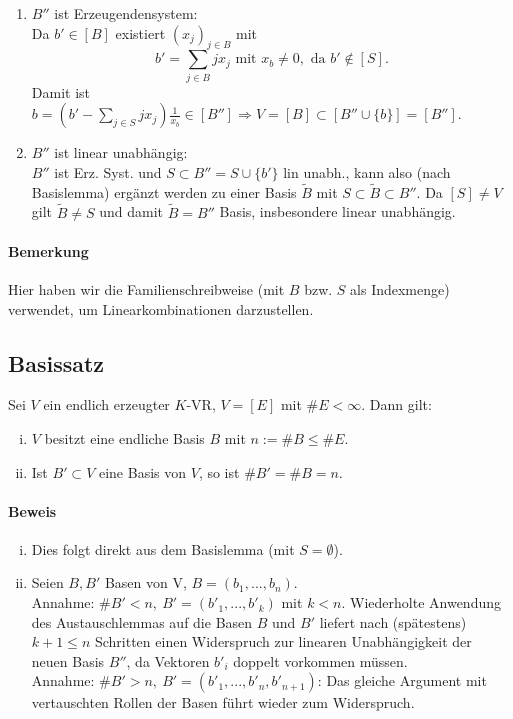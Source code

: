     \begin{enumerate}
	    \item $B''$ ist Erzeugendensystem:\\
	    Da $b'\in [B]$ existiert $(x_j)_{j\in B}$ mit
		    \[b' = \sum_{j\in B} jx_j \text{ mit } x_b \neq 0, \text{ da } b' \notin [S].\]
	    Damit ist $b=(b'-\sum_{j\in S} jx_j)\frac{1}{x_b} \in [B''] \Rightarrow V = [B] \subset [B'' \cup \{b\}] =  [B'']$.
    
	    \item $B''$ ist linear unabhängig:\\
		    $B''$ ist Erz. Syst. und $S\subset B'' = S \cup \{b'\}$ lin unabh., kann also (nach Basislemma) ergänzt werden zu einer Basis $\tilde{B}$ mit $S\subset \tilde{B}\subset B''$.
		    Da $[S] \neq V$ gilt $\tilde{B} \neq S$ und damit $\tilde{B} = B''$ Basis, insbesondere linear unabhängig.
    \end{enumerate}
    
\paragraph{Bemerkung}
    Hier haben wir die Familienschreibweise (mit $B$ bzw. $S$ als Indexmenge) verwendet, um Linearkombinationen darzustellen.
    
\subsection{Basissatz}
	\begin{Satz}[Basissatz]
	Sei $V$ ein endlich erzeugter $K$-VR, $V=[E]$ mit $\#E < \infty$. Dann gilt:
	\begin{enumerate}[(i)]
		\item $V$ besitzt eine endliche Basis $B$ mit $n:= \#B \leq \#E$.
		\item Ist $B'\subset V$ eine Basis von $V$, so ist $\#B' = \#B = n$.
	\end{enumerate}
	\end{Satz}
    
\paragraph{Beweis}
    \begin{enumerate}[(i)]
        \item  Dies folgt direkt aus dem Basislemma (mit $S=\emptyset$).
        \item Seien $B,B'$ Basen von V, $B = (b_1,...,b_n)$.\\
        Annahme: $\#B' < n,\ B' = (b'_1,...,b'_k)$ mit $k < n$. Wiederholte Anwendung des Austauschlemmas auf die Basen $B$ und $B'$ liefert nach (spätestens) $k+1\leq n$ Schritten einen Widerspruch zur linearen Unabhängigkeit der neuen Basis $B''$, da Vektoren $b'_i$ doppelt vorkommen müssen.\\
        Annahme: $\#B' > n,\ B' = (b'_1,...,b'_n,b'_{n+1})$: Das gleiche Argument mit vertauschten Rollen der Basen führt wieder zum Widerspruch.
     \end{enumerate}

